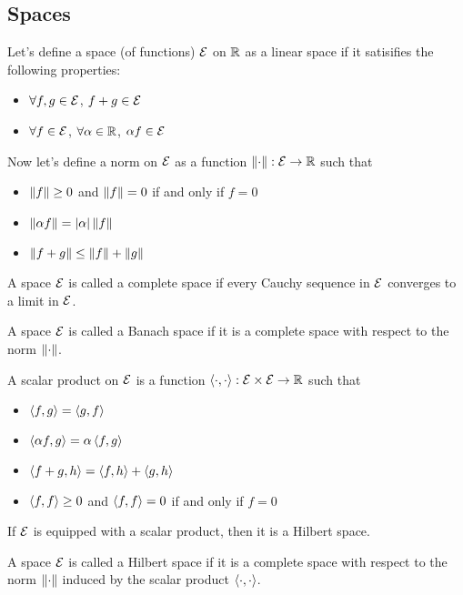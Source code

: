 \subsection{Spaces}
Let's define a space (of functions) $\mathcal{E}$ on $\mathbb{R}$ as a linear space if it satisifies the following properties:
\begin{itemize}
    \item $\forall f,g\in\mathcal{E}$, $f+g\in\mathcal{E}$
    \item $\forall f\in\mathcal{E}$, $\forall \alpha\in\mathbb{R}$, $\alpha f\in\mathcal{E}$
\end{itemize}
Now let's define a norm on $\mathcal{E}$ as a function $\left\| \cdot \right\|:\mathcal{E}\rightarrow\mathbb{R}$ such that
\begin{itemize}
    \item $\left\| f \right\|\geq 0$ and $\left\| f \right\|=0$ if and only if $f=0$
    \item $\left\| \alpha f \right\|=\left| \alpha\right|\left\| f \right\|$
    \item $\left\| f+g \right\|\leq \left\| f \right\|+\left\| g \right\|$
\end{itemize}
\begin{definition}
    A space $\mathcal{E}$ is called a complete space if every Cauchy sequence in $\mathcal{E}$ converges to a limit in $\mathcal{E}$.
\end{definition}
\begin{definition}
    A space $\mathcal{E}$ is called a Banach space if it is a complete space with respect to the norm $\left\| \cdot \right\|$.
\end{definition}
\begin{definition}
    A scalar product on $\mathcal{E}$ is a function $\left\langle \cdot,\cdot\right\rangle:\mathcal{E}\times\mathcal{E}\rightarrow\mathbb{R}$ such that
    \begin{itemize}
        \item $\left\langle f,g\right\rangle=\left\langle g,f\right\rangle$
        \item $\left\langle \alpha f,g\right\rangle=\alpha\left\langle f,g\right\rangle$
        \item $\left\langle f+g,h\right\rangle=\left\langle f,h\right\rangle+\left\langle g,h\right\rangle$
        \item $\left\langle f,f\right\rangle\geq 0$ and $\left\langle f,f\right\rangle=0$ if and only if $f=0$
    \end{itemize}
\end{definition}
If $\mathcal{E}$ is equipped with a scalar product, then it is a Hilbert space.
\begin{definition}
    A space $\mathcal{E}$ is called a Hilbert space if it is a complete space with respect to the norm $\left\| \cdot \right\|$ induced by the scalar product $\left\langle \cdot,\cdot\right\rangle$.
\end{definition}

